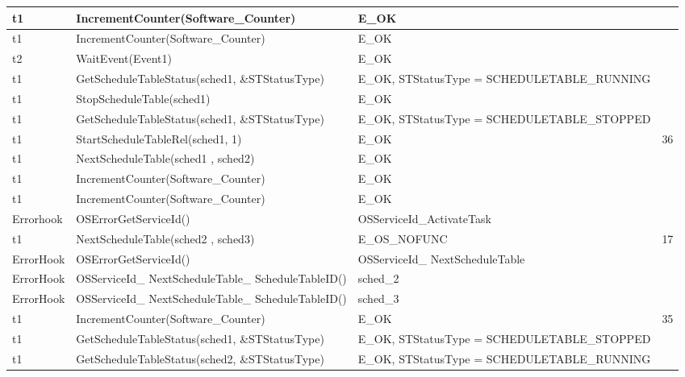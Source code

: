 \documentclass[10pt]{article}
\newlength{\Li}\settowidth{\Li}{Running}
\newlength{\Lii}\setlength{\Lii}{7cm}
\newlength{\Liiii}\setlength{\Liiii}{0.9cm}
\newlength{\Liii}\setlength{\Liii}{\textwidth} \addtolength{\Liii}{-\Li} \addtolength{\Liii}{-\Lii} \addtolength{\Liii}{-\Liiii}
\begin{document}
\begin{supertabular}{|p{\Li}|p{\Lii}|p{\Liii}|p{\Liiii}|}
	t1		& IncrementCounter(Software\_Counter)										& E\_OK												& \\ \hline
	t1		& IncrementCounter(Software\_Counter)										& E\_OK												& \\ \hline
	
	t2		& WaitEvent(Event1)														& E\_OK												& \\ \hline

	t1		& GetScheduleTableStatus(sched1, \&STStatusType)							& E\_OK, STStatusType = SCHEDULETABLE\_RUNNING		& \\ \hline
	t1		& StopScheduleTable(sched1)												& E\_OK												&  \\ \hline
	t1		& GetScheduleTableStatus(sched1, \&STStatusType)							& E\_OK, STStatusType = SCHEDULETABLE\_STOPPED		& \\ \hline

	t1		& StartScheduleTableRel(sched1, 1)										& E\_OK												& 36 \\ \hline
	t1		& NextScheduleTable(sched1 , sched2)										& E\_OK												& \\ \hline
	t1		& IncrementCounter(Software\_Counter)										& E\_OK												& \\ \hline
	t1		& IncrementCounter(Software\_Counter)										& E\_OK												& \\ \hline
	Errorhook	& OSErrorGetServiceId()													& OSServiceId\_ActivateTask								& \\ \hline
	t1		& NextScheduleTable(sched2 , sched3)										& E\_OS\_NOFUNC										& 17 \\ \hline
	ErrorHook	& OSErrorGetServiceId()													& OSServiceId\_ NextScheduleTable						& \\ \hline
	ErrorHook	& OSServiceId\_ NextScheduleTable\_ ScheduleTableID()						& sched\_2											& \\ \hline
	ErrorHook	& OSServiceId\_ NextScheduleTable\_ ScheduleTableID()						& sched\_3											& \\ \hline
	
	t1		& IncrementCounter(Software\_Counter)										& E\_OK												& 35 \\ \hline
	t1		& GetScheduleTableStatus(sched1, \&STStatusType)							& E\_OK, STStatusType = SCHEDULETABLE\_STOPPED		& \\ \hline
	t1		& GetScheduleTableStatus(sched2, \&STStatusType)							& E\_OK, STStatusType = SCHEDULETABLE\_RUNNING		& \\ \hline
	

\end{supertabular}
\end{document}
